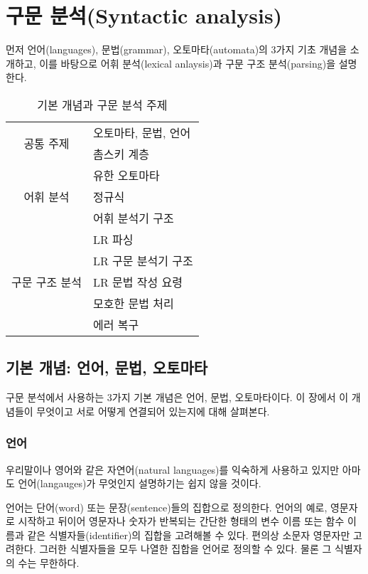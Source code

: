\documentclass[a4paper]{book}
\begin{document}
\chapter{구문 분석(Syntactic analysis)}

먼저 언어(languages), 문법(grammar), 오토마타(automata)의 3가지 기초
개념을 소개하고, 이를 바탕으로 어휘 분석(lexical anlaysis)과 구문 구조
분석(parsing)을 설명한다.

\begin{table}[ht]
\begin{center}
\begin{tabular}{|c|l|} \hline
  \multirow{2}{*}{공통 주제}
    & 오토마타, 문법, 언어 \\ \cline{2-2}
    & 촘스키 계층 \\ \hline
  \multirow{3}{*}{어휘 분석} & 유한 오토마타 \\ \cline{2-2}
    & 정규식 \\ \cline{2-2}
    & 어휘 분석기 구조 \\ \hline
  \multirow{5}{*}{구문 구조 분석}
    & LR 파싱 \\ \cline{2-2}
    & LR 구문 분석기 구조 \\ \cline{2-2}
    & LR 문법 작성 요령 \\ \cline{2-2}
    & 모호한 문법 처리 \\ \cline{2-2}
    & 에러 복구 \\ \hline
\end{tabular}
\caption{기본 개념과 구문 분석 주제}
\label{table:syntaxanalysis}
\end{center}
\end{table}


\section{기본 개념: 언어, 문법, 오토마타}


구문 분석에서 사용하는 3가지 기본 개념은 언어, 문법, 오토마타이다. 이
장에서 이 개념들이 무엇이고 서로 어떻게 연결되어 있는지에 대해 살펴본다.

\subsection{언어}
\label{subsec:language}


우리말이나 영어와 같은 자연어(natural languages)를 익숙하게 사용하고
있지만 아마도 언어(langauges)가 무엇인지 설명하기는 쉽지 않을 것이다.

언어는 단어(word) 또는 문장(sentence)들의 집합으로 정의한다. 언어의
예로, 영문자로 시작하고 뒤이어 영문자나
숫자가 반복되는 간단한 형태의 변수 이름 또는 함수 이름과 같은
식별자들(identifier)의 집합을 고려해볼 수 있다.
%
편의상 소문자 영문자만 고려한다. 그러한 식별자들을 모두 나열한 집합을
언어로 정의할 수 있다. 물론 그 식별자의 수는 무한하다.
\end{document}

